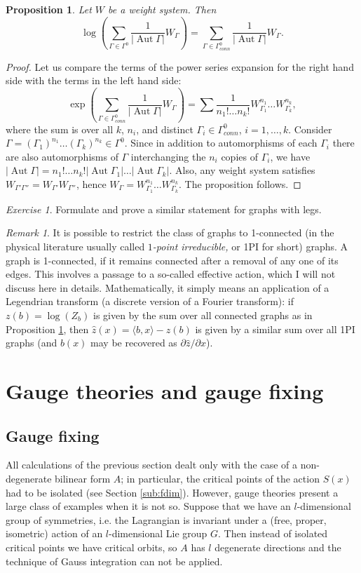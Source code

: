 \documentclass[10pt]{amsart}
\newtheorem{prop}[thm]{Proposition}
\theoremstyle{definition}
\theoremstyle{remark}
\newtheorem{rem}[thm]{Remark}
\newtheorem{exs}[thm]{Exercise}
\newcommand{\dd}{\partial}
\def\<{\langle}
\def\>{\rangle}
\newcommand{\GG}{\Gamma}
\newcommand{\Aut}{\operatorname{Aut}}
\begin{document}
\begin{prop}\label{log}
Let $W$ be a weight system. Then
$$
    \log\left (\sum_{\GG\in\GG^0}\frac1{|\Aut\GG|}W_\GG \right)=
      \sum_{\GG\in\GG^0_{conn}}\frac1{|\Aut \GG|}W_\GG .
$$
\end{prop}

\begin{proof}
Let us compare the terms of the power series expansion for the
right hand side with the terms in the left hand side:
$$
  \exp\left(\sum_{\GG\in\GG^0_{conn}}\frac1{|\Aut \GG|}W_\GG\right)=
   \sum\frac1{n_1!\dots n_k!} W_{\GG_1}^{n_1}\dots W_{\GG_k}^{n_k},
$$
where the sum is over all $k$, $n_i$, and distinct
$\GG_i\in\GG^0_{conn}$, $i=1,\dots,k$.
Consider $\GG=(\GG_1)^{n_1}\dots(\GG_k)^{n_k}\in\GG^0$.
Since in addition to automorphisms of each $\GG_i$ there are also
automorphisms of $\GG$ interchanging the $n_i$ copies of $\GG_i$,
we have $|\Aut\GG|=n_1!\dots n_k!|\Aut\GG_1|\dots|\Aut\GG_k|$.
Also, any weight system satisfies $W_{\GG'\GG''}=W_{\GG'}W_{\GG''}$,
hence $W_\GG= W_{\GG_1}^{n_1}\dots W_{\GG_k}^{n_k}$.
The proposition follows.
\end{proof}

\begin{exs}
Formulate and prove a similar statement for graphs with legs.
\end{exs}

\begin{rem}
It is possible to restrict the class of graphs to 1-connected (in
the physical literature usually called {\em $1$-point
irreducible,} or 1PI for short) graphs. A graph is 1-connected, if
it remains connected after a removal of any one of its edges. This
involves a passage to a so-called effective action, which I will
not discuss here in details. Mathematically, it simply means an
application of a Legendrian transform (a discrete version of a
Fourier transform): if $z(b)=\log(Z_b)$ is given by the sum over
all connected graphs as in Proposition \ref{log}, then
$\hat{z}(x)=\<b,x\>-z(b)$ is given by a similar sum over all 1PI
graphs (and $b(x)$ may be recovered as $\dd\hat{z}/\dd x$).
\end{rem}
\section{Gauge theories and gauge fixing}
\subsection{Gauge fixing}
All calculations of the previous section dealt only with the case
of a non-degenerate bilinear form $A$; in particular, the critical
points of the action $S(x)$ had to be isolated (see Section
\ref{sub:fdim}). However, gauge theories present a large class of
examples when it is not so. Suppose that we have an
$l$-dimensional group of symmetries, i.e. the Lagrangian is
invariant under a (free, proper, isometric) action of an $l$-dimensional
Lie group $G$. Then instead of isolated critical points we have
critical orbits, so $A$ has $l$ degenerate directions and the
technique of Gauss integration can not be applied.
\end{document}
